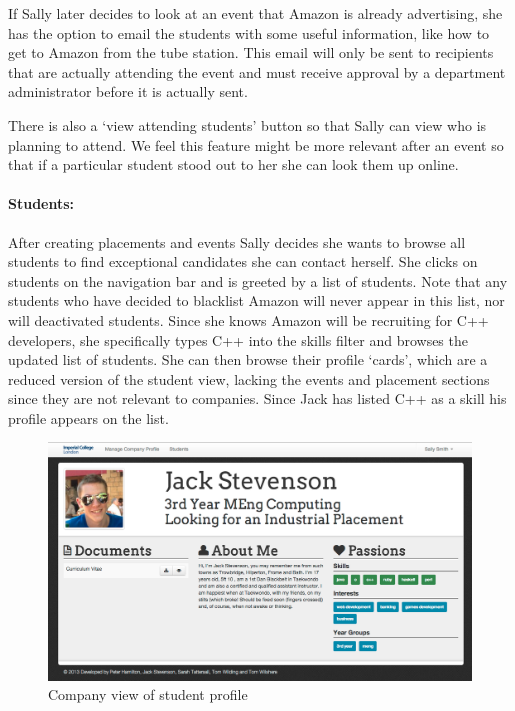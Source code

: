     If Sally later decides to look at an event that Amazon is already advertising, she has the option to email the students with some useful information, like how to get to Amazon from the tube station.
    This email will only be sent to recipients that are actually attending the event and must receive approval by a department administrator before it is actually sent.

    There is also a `view attending students' button so that Sally can view who is planning to attend. We feel this feature might be more relevant after an event so that if a particular student stood out to her she can look them up online.

  \paragraph{Students:}
    After creating placements and events Sally decides she wants to browse all students to find exceptional candidates she can contact herself. She clicks on students on the navigation bar and is greeted by a list of students. Note that any students who have decided to blacklist Amazon will never appear in this list, nor will deactivated students.
    Since she knows Amazon will be recruiting for C++ developers, she specifically types C++ into the skills filter
    and browses the updated list of students.
    She can then browse their profile `cards', which are a reduced version of the student view, lacking the events and placement sections since they are not relevant to companies. Since Jack has listed C++ as a skill his profile appears on the list.

    \begin{figure}[H]\centering
    \includegraphics[scale=0.3]{images/user_experiences/company/jack_profile}
    \caption{Company view of student profile}
    \end{figure}

